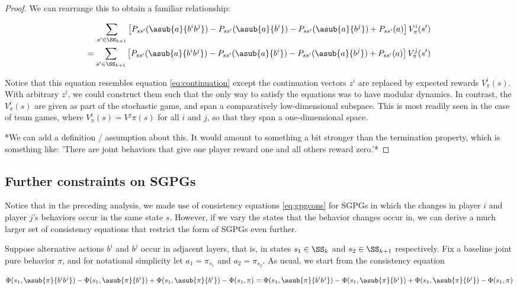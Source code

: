 \begin{proof}
We can rearrange this to obtain a familiar relationship:

\begin{align*}
\sum_{s' \in \SS_{k+1}} \left[P_{ss'}(\asub{a}{b^ib^j})- P_{ss'}(\asub{a}{b^i}) - P_{ss'}(\asub{a}{b^j}) +  P_{ss'}(a)\right] V^i_{\pi}(s') \\
= \sum_{s' \in \SS_{k+1}} \left[P_{ss'}(\asub{a}{b^ib^j}) - P_{ss'}(\asub{a}{b^i}) - P_{ss'}(\asub{a}{b^j}) +  P_{ss'}(a)\right] V^j_{\pi}(s')
\label{eq:gpgcons}
\end{align*}


Notice that this equation resembles equation \ref{eq:continuation} except the continuation vectors $z^i$ are replaced by expected rewards $V^i_{\pi}(s)$. With arbitrary $z^i$, we could construct them such that the only way to satisfy the equations was to have modular dynamics. In contrast, the $V^i_{\pi}(s)$ are given as part of the stochastic game, and span a comparatively low-dimensional subspace. This is most readily seen in the case of team games, where $V^i_{\pi}(s) = V^j{\pi}(s)$ for all $i$ and $j$, so that they span a one-dimensional space. 

*We can add a definition / assumption about this. It would amount to something a bit stronger than the termination property, which is something like: 'There are joint behaviors that give one player reward one and all others reward zero.'*

\end{proof}

\subsection{Further constraints on SGPGs}

Notice that in the preceding analysis, we made use of consistency equations \ref{eq:gpgcons} for SGPGs in which the changes in player $i$ and player $j$'s behaviors occur in the same state $s$. However, if we vary the states that the behavior changes occur in, we can derive a much larger set of consistency equations that restrict the form of SGPGs even further. 

Suppose alternative actions $b^i$ and $b^j$ occur in adjacent layers, that is, in states $s_1 \in \SS_k$ and $s_2 \in \SS_{k+1}$ respectively. Fix a baseline joint pure behavior $\pi$, and for notational simplicity let $a_1 = \pi_{s_1}$ and $a_2 = \pi_{s_2}$. As usual, we start from the consistency equation

$$
\Phi(s_1,\asub{\pi}{b^ib^j}) - \Phi(s_1,\asub{\pi}{b^i}) + \Phi(s_1,\asub{\pi}{b^i}) -
\Phi(s_1,\pi)
=
\Phi(s_1,\asub{\pi}{b^ib^j}) - \Phi(s_1,\asub{\pi}{b^j}) + \Phi(s_1,\asub{\pi}{b^j}) -
\Phi(s_1,\pi)
$$

